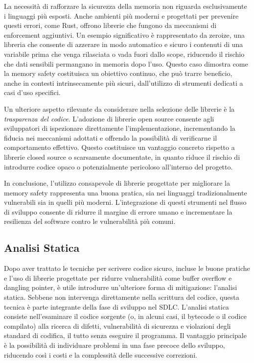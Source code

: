 La necessità di rafforzare la sicurezza della memoria non riguarda esclusivamente
i linguaggi più esposti. Anche ambienti più moderni e progettati per prevenire
questi errori, come Rust, offrono librerie che fungono da meccanismi di
enforcement aggiuntivi. Un esempio significativo è rappresentato da zeroize, una
libreria che consente di azzerare in modo automatico e sicuro i contenuti di una
variabile prima che venga rilasciata o vada fuori dallo scope, riducendo il rischio
che dati sensibili permangano in memoria dopo l'uso. Questo caso dimostra come
la memory safety costituisca un obiettivo continuo, che può trarre beneficio,
anche in contesti intrinsecamente più sicuri, dall'utilizzo di strumenti dedicati
a casi d'uso specifici.

Un ulteriore aspetto rilevante da considerare nella selezione delle librerie è la
\textit{trasparenza del codice}. L'adozione di librerie open source consente agli
sviluppatori di ispezionare direttamente l'implementazione, incrementando la
fiducia nei meccanismi adottati e offrendo la possibilità di verificarne il
comportamento effettivo. Questo costituisce un vantaggio concreto rispetto a librerie
closed source o scarsamente documentate, in quanto riduce il rischio di
introdurre codice opaco o potenzialmente pericoloso all'interno del progetto.

In conclusione, l'utilizzo consapevole di librerie progettate per migliorare la memory
safety rappresenta una buona pratica, sia nei linguaggi tradizionalmente
vulnerabili sia in quelli più moderni. L'integrazione di questi strumenti nel flusso
di sviluppo consente di ridurre il margine di errore umano e incrementare la resilienza
del software contro le vulnerabilità più comuni.

\subsection{Analisi Statica}
\label{sec:analisi-statica}

Dopo aver trattato le tecniche per scrivere codice sicuro, incluse le buone
pratiche e l'uso di librerie progettate per ridurre vulnerabilità come buffer
overflow e dangling pointer, è utile introdurre un'ulteriore forma di
mitigazione: l'analisi statica. Sebbene non intervenga direttamente nella
scrittura del codice, questa tecnica è parte integrante della fase di sviluppo nel
SDLC. L'analisi statica consiste nell'esaminare il codice sorgente (o, in alcuni
casi, il bytecode o il codice compilato) alla ricerca di difetti, vulnerabilità di
sicurezza e violazioni degli standard di codifica, il tutto senza eseguire il
programma. Il vantaggio principale è la possibilità di individuare problemi in una
fase precoce dello sviluppo, riducendo così i costi e la complessità delle
successive correzioni.

